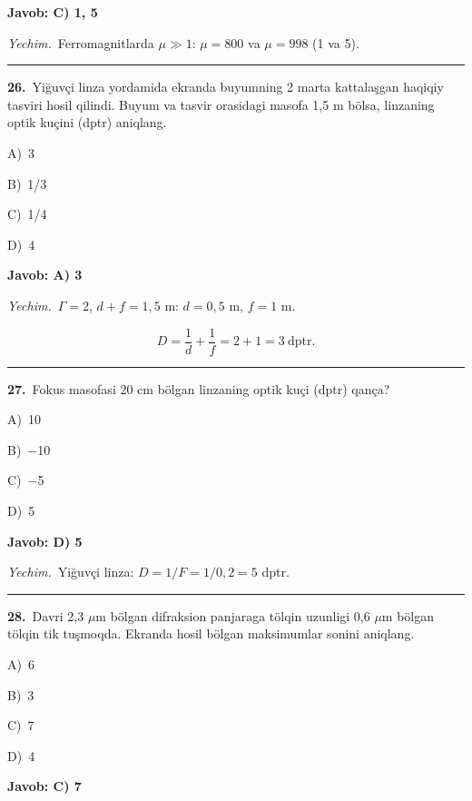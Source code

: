 \documentclass[11pt,a4paper]{article}
\newcommand{\opt}[2]{\hspace*{4mm}#1)\ #2\par}
\begin{document}
\noindent\colorbox{gray!12}{\parbox{\dimexpr\linewidth-2\fboxsep}{\textbf{Javob: C) 1, 5}}}\par\smallskip
\noindent\textit{Yechim.}\ Ferromagnitlarda $\mu\gg1$: $\mu=800$ va $\mu=998$ (1 va 5).\par\par\medskip\hrule\medskip
{}\noindent\begin{minipage}{\linewidth}
\textbf{26.}\ Yiğuvçi linza yordamida ekranda buyumning 2 marta kattalaşgan haqiqiy tasviri hosil qilindi. Buyum va tasvir orasidagi masofa 1,5 m bölsa, linzaning optik kuçini (dptr) aniqlang.\par\smallskip
\opt{A}{3}
\opt{B}{1/3}
\opt{C}{1/4}
\opt{D}{4}
\end{minipage}\vspace{2pt}\par
\noindent\colorbox{gray!12}{\parbox{\dimexpr\linewidth-2\fboxsep}{\textbf{Javob: A) 3}}}\par\smallskip
\noindent\textit{Yechim.}\ $\Gamma=2$, $d+f=1{,}5$ m: $d=0{,}5$ m, $f=1$ m.\par
\[D=\frac1d+\frac1f=2+1=3\ \text{dptr}.\]\par\medskip\hrule\medskip
{}\noindent\begin{minipage}{\linewidth}
\textbf{27.}\ Fokus masofasi 20 cm bölgan linzaning optik kuçi (dptr) qança?\par\smallskip
\opt{A}{10}
\opt{B}{$-$10}
\opt{C}{$-$5}
\opt{D}{5}
\end{minipage}\vspace{2pt}\par
\noindent\colorbox{gray!12}{\parbox{\dimexpr\linewidth-2\fboxsep}{\textbf{Javob: D) 5}}}\par\smallskip
\noindent\textit{Yechim.}\ Yiğuvçi linza: $D=1/F=1/0{,}2=5$ dptr.\par\par\medskip\hrule\medskip
{}\noindent\begin{minipage}{\linewidth}
\textbf{28.}\ Davri 2,3 $\mu$m bölgan difraksion panjaraga tölqin uzunligi 0,6 $\mu$m bölgan tölqin tik tuşmoqda. Ekranda hosil bölgan maksimumlar sonini aniqlang.\par\smallskip
\opt{A}{6}
\opt{B}{3}
\opt{C}{7}
\opt{D}{4}
\end{minipage}\vspace{2pt}\par
\noindent\colorbox{gray!12}{\parbox{\dimexpr\linewidth-2\fboxsep}{\textbf{Javob: C) 7}}}\par\smallskip
\end{document}
